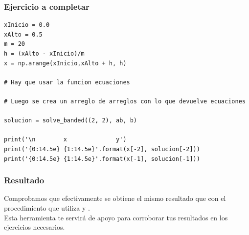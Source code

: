 \documentclass[12pt]{beamer}
\begin{document}
\begin{frame}
\frametitle{Ejercicio a completar}
\begin{lstlisting}[caption=Propuesta de código para resolver el sistema pentadiagonal]
xInicio = 0.0
xAlto = 0.5
m = 20
h = (xAlto - xInicio)/m
x = np.arange(xInicio,xAlto + h, h)

# Hay que usar la funcion ecuaciones

# Luego se crea un arreglo de arreglos con lo que devuelve ecuaciones

solucion = solve_banded((2, 2), ab, b)

print('\n        x              y')
print('{0:14.5e} {1:14.5e}'.format(x[-2], solucion[-2]))
print('{0:14.5e} {1:14.5e}'.format(x[-1], solucion[-1]))
\end{lstlisting}
\end{frame}
\begin{frame}
\frametitle{Resultado}
Comprobamos que efectivamente se obtiene el mismo resultado que con el procedimiento que utiliza  y .
\\
\bigskip
\pause
Esta herramienta te servirá de apoyo para corroborar tus resultados en los ejercicios necesarios.
\end{frame}
\end{document}
